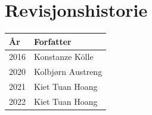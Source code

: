 
\section*{Revisjonshistorie}
\begin{center}
 \begin{tabular}{|p{1.5cm} p{5.5cm}|} 
 \hline
 År & Forfatter \\ [0.5ex] 
 \hline\hline
 2016 & Konstanze Kölle  \\ 
 \hline
 2020 & Kolbjørn Austreng  \\ 
 \hline
 2021 & Kiet Tuan Hoang \\
 \hline
 2022 & Kiet Tuan Hoang \\
 \hline
\end{tabular}
\end{center}


